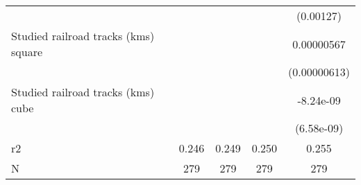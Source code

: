 {\begin{tabular}{l*{4}{c}}
                    &                     &                     &                     &   (0.00127)         \\
[1em]
Studied railroad tracks (kms) square&                     &                     &                     &  0.00000567         \\
                    &                     &                     &                     &(0.00000613)         \\
[1em]
Studied railroad tracks (kms) cube&                     &                     &                     &   -8.24e-09         \\
                    &                     &                     &                     &  (6.58e-09)         \\
\hline
r2                  &       0.246         &       0.249         &       0.250         &       0.255         \\
N                   &         279         &         279         &         279         &         279         \\
\hline\hline
\end{tabular}
}
